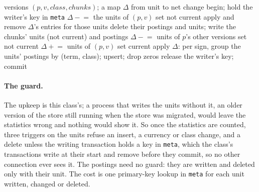 \documentclass[11pt]{article}
\theoremstyle{plain}
\theoremstyle{definition}
\theoremstyle{remark}
\newcommand{\code}[1]{\texttt{#1}}
\begin{document}
\begin{algorithm}[t]
\caption{The statistics' upkeep inside one landing transaction.}\label{alg:upkeep}
\begin{algorithmic}[1]
\Require versions $(p, v, \mathit{class}, \mathit{chunks})$; a map $\Delta$ from unit to net change
\State begin; hold the writer's key in \code{meta}
    \State $\Delta \mathrel{-}= $ the units of $(p, v)$ set not current
    \State apply and remove $\Delta$'s entries for those units 
    \State delete their postings and units; write the chunks' units (not current) and postings
  \EndIf
  \State $\Delta \mathrel{-}= $ units of $p$'s other versions set not current \Comment{\code{RETURNING}}
  \State $\Delta \mathrel{+}= $ units of $(p, v)$ set current
\EndFor
\State apply $\Delta$: per sign, group the units' postings by (term, class); upsert; drop zeros
\State release the writer's key; commit
\end{algorithmic}
\end{algorithm}

\paragraph{The guard.} The upkeep is this class's; a process that writes the units without it, an
older version of the store still running when the store was migrated, would leave the statistics
wrong and nothing would show it. So once the statistics are counted, three triggers on the units
refuse an insert, a currency or class change, and a delete unless the writing transaction holds a
key in \code{meta}, which the class's transactions write at their start and remove before they
commit, so no other connection ever sees it. The postings need no guard: they are written and
deleted only with their unit. The cost is one primary-key lookup in \code{meta} for each unit
written, changed or deleted.
\end{document}
